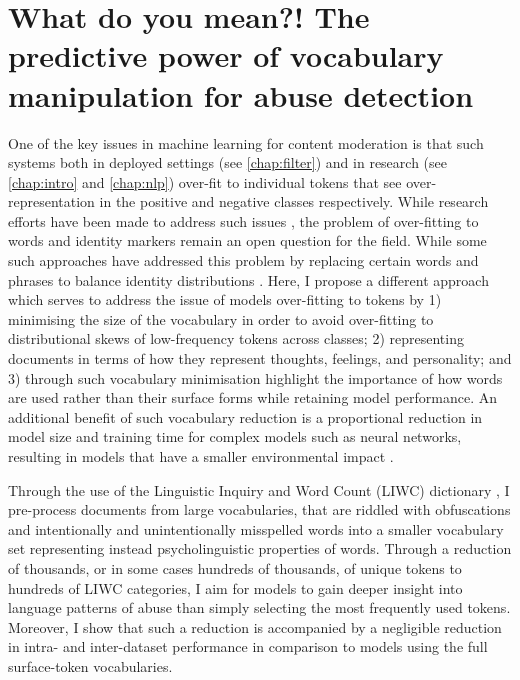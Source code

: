 \ifpdf
    \graphicspath{{Chapter4/Figs/Raster/}{Chapter4/Figs/PDF/}{Chapter4/Figs/}}
\else
    \graphicspath{{Chapter4/Figs/Vector/}{Chapter4/Figs/}}
\fi

\chapter{What do you mean?! The predictive power of vocabulary manipulation for abuse detection}\label{chap:liwc}

One of the key issues in machine learning for content moderation is that such systems both in deployed settings (see \cref{chap:filter}) and in research (see \cref{chap:intro} and \cref{chap:nlp}) over-fit to individual tokens that see over-representation in the positive and negative classes respectively. While research efforts have been made to address such issues \cite{CITE: cite papers that try to address overfitting}, the problem of over-fitting to words and identity markers remain an open question for the field. While some such approaches have addressed this problem by replacing certain words and phrases to balance identity distributions \cite{Dixon:2018}. Here, I propose a different approach which serves to address the issue of models over-fitting to tokens by 1) minimising the size of the vocabulary in order to avoid over-fitting to distributional skews of low-frequency tokens across classes; 2) representing documents in terms of how they represent thoughts, feelings, and personality; and 3) through such vocabulary minimisation highlight the importance of how words are used rather than their surface forms while retaining model performance. An additional benefit of such vocabulary reduction is a proportional reduction in model size and training time for complex models such as neural networks, resulting in models that have a smaller environmental impact \citep{Strubell:2019}.

Through the use of the Linguistic Inquiry and Word Count (LIWC) dictionary \cite{LIWC:2015,Pennebaker:2001}, I pre-process documents from large vocabularies, that are riddled with obfuscations and intentionally and unintentionally misspelled words into a smaller vocabulary set representing instead psycholinguistic properties of words. Through a reduction of thousands, or in some cases hundreds of thousands, of unique tokens to hundreds of LIWC categories, I aim for models to gain deeper insight into language patterns of abuse than simply selecting the most frequently used tokens. Moreover, I show that such a reduction is accompanied by a negligible reduction in intra- and inter-dataset performance in comparison to models using the full surface-token vocabularies.

